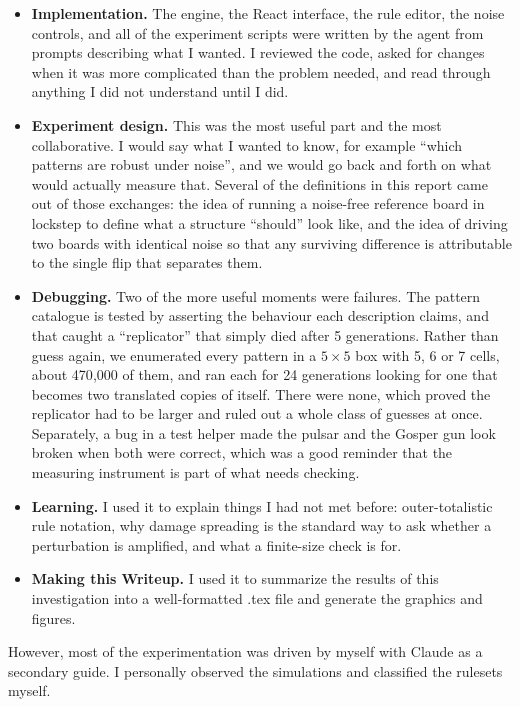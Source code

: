 \documentclass[11pt]{article}
\begin{document}
\begin{itemize}
  \item \textbf{Implementation.} The engine, the React interface, the rule editor, the noise
    controls, and all of the experiment scripts were written by the agent from prompts describing
    what I wanted. I reviewed the code, asked for changes when it was more complicated than the
    problem needed, and read through anything I did not understand until I did.
  \item \textbf{Experiment design.} This was the most useful part and the most collaborative. I
    would say what I wanted to know, for example ``which patterns are robust under noise'', and we
    would go back and forth on what would actually measure that. Several of the definitions in this
    report came out of those exchanges: the idea of running a noise-free reference board in lockstep
    to define what a structure ``should'' look like, and the idea of driving two boards with
    identical noise so that any surviving difference is attributable to the single flip that
    separates them.
  \item \textbf{Debugging.} Two of the more useful moments were failures. The pattern catalogue is
    tested by asserting the behaviour each description claims, and that caught a ``replicator'' that
    simply died after 5 generations. Rather than guess again, we enumerated every pattern in a
    $5\times5$ box with 5, 6 or 7 cells, about 470{,}000 of them, and ran each for 24 generations
    looking for one that becomes two translated copies of itself. There were none, which proved the
    replicator had to be larger and ruled out a whole class of guesses at once. Separately, a bug in
    a test helper made the pulsar and the Gosper gun look broken when both were correct, which was a
    good reminder that the measuring instrument is part of what needs checking.
  \item \textbf{Learning.} I used it to explain things I had not met before: outer-totalistic rule
    notation, why damage spreading is the standard way to ask whether a perturbation is amplified,
    and what a finite-size check is for.
  \item \textbf{Making this Writeup.} I used it to summarize the results of this investigation into
    a well-formatted .tex file and generate the graphics and figures.
\end{itemize}

However, most of the experimentation was driven by myself with Claude as a secondary guide. I
personally observed the simulations and classified the rulesets myself.
\end{document}
